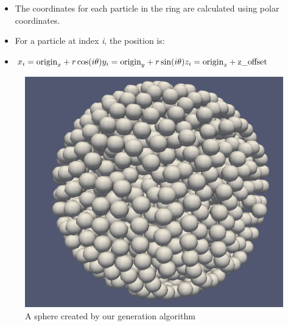 \documentclass{article}
\begin{document}
\begin{itemize}
\begin{enumerate}
        \begin{itemize}
            \item The coordinates for each particle in the ring are calculated using polar coordinates.
            \item For a particle at index \textit{i}, the position is:
            \item $x_i = \text{origin}_x + r \cos(i \theta)\newline y_i = \text{origin}_y + r \sin(i \theta)\newline z_i = \text{origin}_z + \text{z\_offset}$
        \end{itemize}
    \end{enumerate}
\end{itemize}

\begin{figure}[H]
    \includegraphics[width=\textwidth]{res/sphere}
    \caption{A sphere created by our generation algorithm}
    \label{fig:sphere}
\end{figure}
\end{document}
